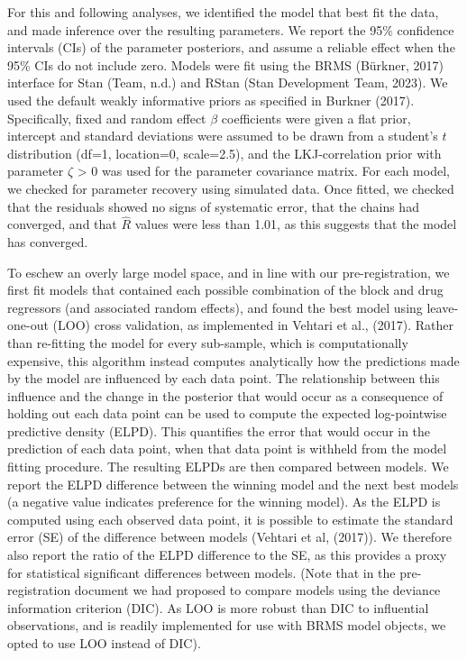 \documentclass[
  man]{apa6}
\begin{document}
For this and following analyses, we identified the model that best fit the data, and made inference over the resulting parameters. We report the 95\% confidence intervals (CIs) of the parameter posteriors, and assume a reliable effect when the 95\% CIs do not include zero. Models were fit using the BRMS (Bürkner, 2017) interface for Stan (Team, n.d.) and RStan (Stan Development Team, 2023). We used the default weakly informative priors as specified in Burkner (2017). Specifically, fixed and random effect \(\beta\) coefficients were given a flat prior, intercept and standard deviations were assumed to be drawn from a student's \(t\) distribution (df=1, location=0, scale=2.5), and the LKJ-correlation prior with parameter \(\zeta\) \textgreater{} 0 was used for the parameter covariance matrix. For each model, we checked for parameter recovery using simulated data. Once fitted, we checked that the residuals showed no signs of systematic error, that the chains had converged, and that \(\hat{R}\) values were less than 1.01, as this suggests that the model has converged.

To eschew an overly large model space, and in line with our pre-registration, we first fit models that contained each possible combination of the block and drug regressors (and associated random effects), and found the best model using leave-one-out (LOO) cross validation, as implemented in Vehtari et al., (2017). Rather than re-fitting the model for every sub-sample, which is computationally expensive, this algorithm instead computes analytically how the predictions made by the model are influenced by each data point. The relationship between this influence and the change in the posterior that would occur as a consequence of holding out each data point can be used to compute the expected log-pointwise predictive density (ELPD). This quantifies the error that would occur in the prediction of each data point, when that data point is withheld from the model fitting procedure. The resulting ELPDs are then compared between models. We report the ELPD difference between the winning model and the next best models (a negative value indicates preference for the winning model). As the ELPD is computed using each observed data point, it is possible to estimate the standard error (SE) of the difference between models (Vehtari et al, (2017)). We therefore also report the ratio of the ELPD difference to the SE, as this provides a proxy for statistical significant differences between models. (Note that in the pre-registration document we had proposed to compare models using the deviance information criterion (DIC). As LOO is more robust than DIC to influential observations, and is readily implemented for use with BRMS model objects, we opted to use LOO instead of DIC).
\end{document}

